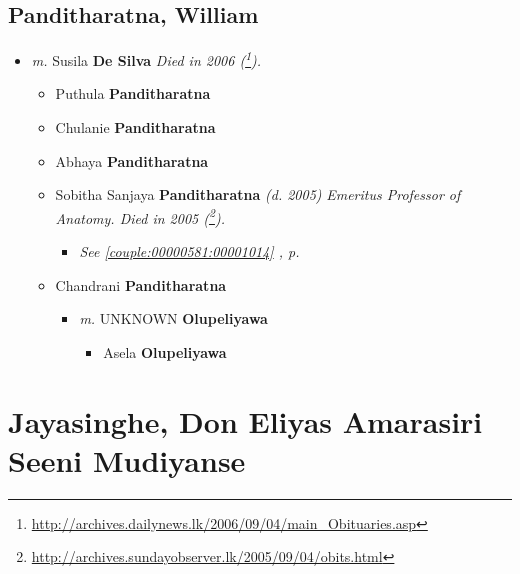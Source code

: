 \documentclass[10pt, openany]{book}
\begin{document}
\chapter{Panditharatna, William}
\label{00002559}
\textcolor{slmaroon}{\textit{}}
\begin{itemize}
\item{\textit{m.} Susila \textbf{De Silva} \textcolor{slorange}{\textit{}} \textcolor{slmaroon}{\textit{Died in 2006 (\footnote{\url{http://archives.dailynews.lk/2006/09/04/main_Obituaries.asp}}).}}   \label{couple:00002559:00002565} \begin{itemize}
\item{Puthula \textbf{Panditharatna} \textcolor{slorange}{\textit{}}
 }
\item{Chulanie \textbf{Panditharatna} \textcolor{slorange}{\textit{}}
 }
\item{Abhaya \textbf{Panditharatna} \textcolor{slorange}{\textit{}}
 }
\item{Sobitha Sanjaya \textbf{Panditharatna} \textcolor{slorange}{\textit{(d. 2005)}} \textcolor{slmaroon}{\textit{Emeritus Professor of Anatomy.
Died in 2005 (\footnote{\url{http://archives.sundayobserver.lk/2005/09/04/obits.html}}).}}
\begin{itemize}
\item{\textcolor{slteal}{\textit{See  \autoref{couple:00000581:00001014} \textit{, p. \pageref{couple:00000581:00001014} }}}}
\end{itemize}
  }
\item{Chandrani \textbf{Panditharatna} \textcolor{slorange}{\textit{}}
\begin{itemize}
\item{\textit{m.} UNKNOWN \textbf{Olupeliyawa} \textcolor{slorange}{\textit{}}   \label{couple:00002568:00002571} \begin{itemize}
\item{Asela \textbf{Olupeliyawa} \textcolor{slorange}{\textit{}}
 }
\end{itemize}}
\end{itemize}
 }
\end{itemize}}
\end{itemize}
 
\part{Jayasinghe, Don Eliyas Amarasiri Seeni Mudiyanse}
\end{document}
